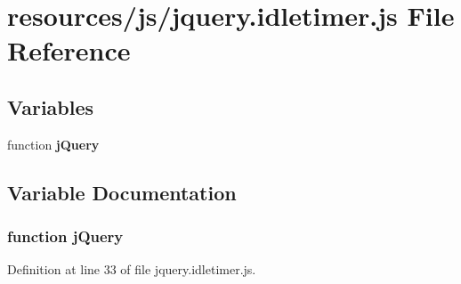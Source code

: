 \section{resources/js/jquery.idletimer.\+js File Reference}
\label{resources_2js_2jquery_8idletimer_8js}
\subsection*{Variables}
\begin{DoxyCompactItemize}
\item 
function {\bf j\+Query}
\end{DoxyCompactItemize}


\subsection{Variable Documentation}
\subsubsection[{j\+Query}]{\setlength{\rightskip}{0pt plus 5cm}function j\+Query}\label{resources_2js_2jquery_8idletimer_8js_a1e853eabf9d8ee3ac2700c9a2ddda672}


Definition at line 33 of file jquery.\+idletimer.\+js.

